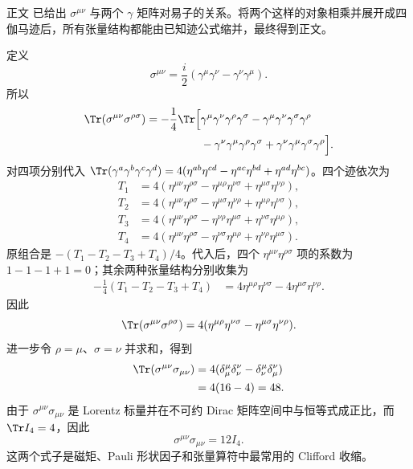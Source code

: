 \begin{derivation}

正文 已给出 $\sigma^{\mu\nu}$ 与两个 $\gamma$ 矩阵对易子的关系。将两个这样的对象相乘并展开成四伽马迹后，所有张量结构都能由已知迹公式缩并，最终得到正文。



定义
\begin{equation*}
\sigma^{\mu\nu}=\frac{i}{2}(\gamma^\mu\gamma^\nu-\gamma^\nu\gamma^\mu).
\end{equation*}
所以
\begin{align*}
\Tr(\sigma^{\mu\nu}\sigma^{\rho\sigma})
=-\frac14\Tr\Big[&
\gamma^\mu\gamma^\nu\gamma^\rho\gamma^\sigma
-\gamma^\mu\gamma^\nu\gamma^\sigma\gamma^\rho\\
&-\gamma^\nu\gamma^\mu\gamma^\rho\gamma^\sigma
+\gamma^\nu\gamma^\mu\gamma^\sigma\gamma^\rho
\Big].
\end{align*}
对四项分别代入
\(
\Tr(\gamma^a\gamma^b\gamma^c\gamma^d)
=4(\eta^{ab}\eta^{cd}-\eta^{ac}\eta^{bd}+\eta^{ad}\eta^{bc})
\)。四个迹依次为
\begin{align*}
T_1&=4(\eta^{\mu\nu}\eta^{\rho\sigma}
-\eta^{\mu\rho}\eta^{\nu\sigma}
+\eta^{\mu\sigma}\eta^{\nu\rho}),\\
T_2&=4(\eta^{\mu\nu}\eta^{\rho\sigma}
-\eta^{\mu\sigma}\eta^{\nu\rho}
+\eta^{\mu\rho}\eta^{\nu\sigma}),\\
T_3&=4(\eta^{\mu\nu}\eta^{\rho\sigma}
-\eta^{\nu\rho}\eta^{\mu\sigma}
+\eta^{\nu\sigma}\eta^{\mu\rho}),\\
T_4&=4(\eta^{\mu\nu}\eta^{\rho\sigma}
-\eta^{\nu\sigma}\eta^{\mu\rho}
+\eta^{\nu\rho}\eta^{\mu\sigma}).
\end{align*}
原组合是 $-(T_1-T_2-T_3+T_4)/4$。代入后，四个
$\eta^{\mu\nu}\eta^{\rho\sigma}$ 项的系数为 $1-1-1+1=0$；其余两种张量结构分别收集为
\begin{align*}
-\frac14(T_1-T_2-T_3+T_4)
&=4\eta^{\mu\rho}\eta^{\nu\sigma}
-4\eta^{\mu\sigma}\eta^{\nu\rho}.
\end{align*}
因此
\begin{equation*}
{
\Tr(\sigma^{\mu\nu}\sigma^{\rho\sigma})
=4(\eta^{\mu\rho}\eta^{\nu\sigma}
-\eta^{\mu\sigma}\eta^{\nu\rho}).}
\end{equation*}
进一步令 $\rho=\mu$、$\sigma=\nu$ 并求和，得到
\begin{align*}
\Tr(\sigma^{\mu\nu}\sigma_{\mu\nu})
&=4(\delta^\mu_\mu\delta^\nu_\nu-\delta^\mu_\nu\delta^\nu_\mu)\\
&=4(16-4)=48.
\end{align*}
由于 $\sigma^{\mu\nu}\sigma_{\mu\nu}$ 是 Lorentz 标量并在不可约 Dirac 矩阵空间中与恒等式成正比，而 $\Tr I_4=4$，因此
\begin{equation*}
\sigma^{\mu\nu}\sigma_{\mu\nu}=12I_4.
\end{equation*}
这两个式子是磁矩、Pauli 形状因子和张量算符中最常用的 Clifford 收缩。
\end{derivation}

